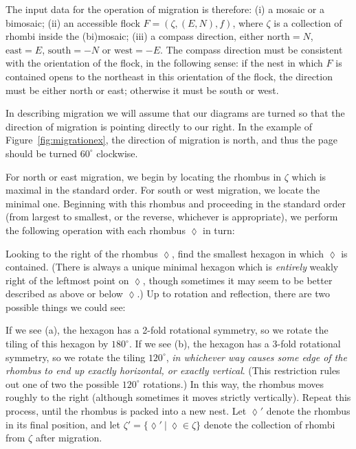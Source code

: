 The input data for the operation of migration is therefore: (i) a
mosaic or a bimosaic; (ii) an accessible flock 
$F = (\zeta, (E,N), f)$, where $\zeta$ is a collection of rhombi
inside the (bi)mosaic; (iii)
a compass direction, either $\text{north}=N$, 
$\text{east}=E$, $\text{south}=-N$ or $\text{west}=-E$.  The compass
direction
must be consistent with the orientation of the flock, in the following
sense: if the nest in which $F$ is contained opens to the northeast
in this orientation of the flock, the direction must be either north 
or east; otherwise it must be south or west.

In describing migration we will assume that our diagrams are
turned so that the direction of migration is pointing directly
to our right.
In the example of Figure~\ref{fig:migrationex}, the 
direction of migration is north, and thus the page should be turned 
$60^\circ$ clockwise.

For north
or east migration, we begin by locating the rhombus in $\zeta$ which 
is maximal in the standard order.  For south or west migration, we 
locate the minimal one.
Beginning with this rhombus and proceeding in the standard order
(from largest to smallest, or the reverse, whichever is appropriate), 
we perform the following operation with each rhombus $\lozenge$ in 
turn:

Looking to the right of the rhombus $\lozenge$, find the smallest
hexagon in which $\lozenge$ is contained.  (There is always a unique 
minimal hexagon which is {\em entirely} weakly right of the leftmost point 
on $\lozenge$, though sometimes it may seem to be better described as 
above or below $\lozenge$.)
Up to rotation and reflection, 
there are two possible things we could see:
\begin{center}
\end{center}
If we see (a), the hexagon has a 2-fold rotational symmetry, so we 
rotate the tiling of this hexagon by $180^\circ$.
If we see (b), the hexagon has a 3-fold rotational symmetry, so we 
rotate the tiling 
$120^\circ$, {\em in whichever way causes some edge of the rhombus to end up
exactly horizontal, or exactly vertical}.  (This restriction rules out 
one of two the possible $120^\circ$ rotations.)  In this way, the rhombus
moves roughly to the right (although sometimes it moves strictly vertically).  
Repeat this process, until the rhombus is
packed into a new nest.  Let $\lozenge'$ denote the rhombus in its final 
position, and
let $\zeta' = \{\lozenge'\ |\ \lozenge \in \zeta\}$ denote the collection 
of rhombi from $\zeta$ after migration.

